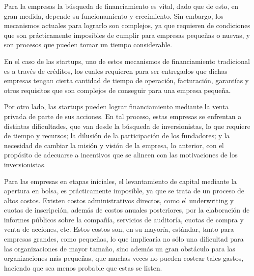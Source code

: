 Para la empresas la búsqueda de financiamiento es vital, dado que de esto, en gran medida, depende su funcionamiento y crecimiento. Sin embargo, los mecanismos actuales para lograrlo son complejos, ya que requieren de condiciones que son prácticamente imposibles de cumplir para empresas pequeñas o nuevas, y son procesos que pueden tomar un tiempo considerable.

En el caso de las startups, uno de estos mecanismos de financiamiento tradicional es a través de créditos, los cuales requieren para ser entregados que dichas empresas tengan cierta cantidad de tiempo de operación, facturación, garantías y otros requisitos que son complejos de conseguir para una empresa pequeña.

Por otro lado, las startups pueden lograr financiamiento mediante la venta privada de parte de sus acciones. En tal proceso, estas empresas se enfrentan a distintas dificultades, que van desde la búsqueda de inversionistas, lo que requiere de tiempo y recursos; la dilusión de la participación de los fundadores; y la necesidad de cambiar la misión y visión de la empresa, lo anterior, con el propósito de adecuarse a incentivos que se alineen con las motivaciones de los inversionistas.

Para las empresas en etapas iniciales, el levantamiento de capital mediante la apertura en bolsa, es prácticamente imposible, ya que se trata de un proceso de altos costos. Existen costos administrativos directos, como el underwriting y cuotas de inscripción, además de costos anuales posteriores, por la elaboración de informes públicos sobre la compañía, servicios de auditoría, cuotas de compra y venta de acciones, etc. Estos costos son, en su mayoría, estándar, tanto para empresas grandes, como pequeñas, lo que implicaría no sólo una dificultad para las organizaciones de mayor tamaño, sino además un gran obstáculo para las organizaciones más pequeñas, que muchas veces no pueden costear tales gastos, haciendo que sea menos probable que estas se listen\cite{pagano}.
